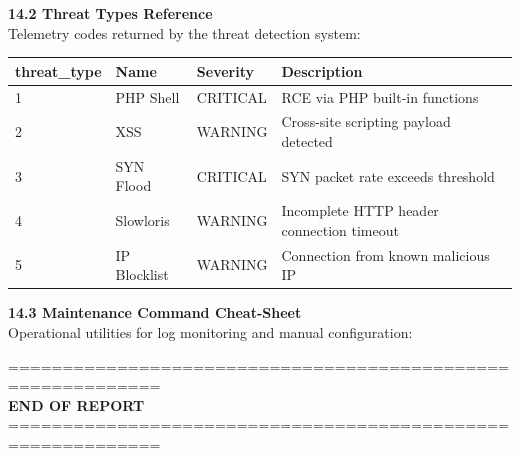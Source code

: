 \documentclass[12pt,a4paper]{article}
\newcommand{\thfmt}[1]{\textbf{#1}}
\begin{document}
\newpage
\textbf{14.2 Threat Types Reference}\\
Telemetry codes returned by the threat detection system:

\begin{center}
\begin{tabular}{C{2.5cm} L{3cm} C{3.5cm} L{5cm}}
\hline
\thfmt{threat\_\allowbreak type} & \thfmt{Name} & \thfmt{Severity} & \thfmt{Description} \\
 & PHP Shell    & CRITICAL & RCE via PHP built-in functions \\
2 & XSS          & WARNING  & Cross-site scripting payload detected \\
3 & SYN Flood    & CRITICAL & SYN packet rate exceeds threshold \\
4 & Slowloris    & WARNING  & Incomplete HTTP header connection timeout \\
5 & IP Blocklist & WARNING  & Connection from known malicious IP \\
\hline
\end{tabular}
\end{center}

\textbf{14.3 Maintenance Command Cheat-Sheet}\\
Operational utilities for log monitoring and manual configuration:


============================================================\\
\textbf{END OF REPORT}\\
============================================================
\end{document}
